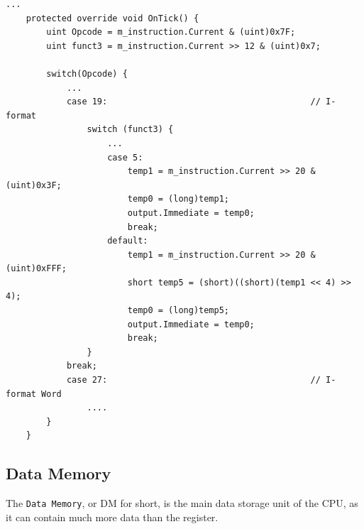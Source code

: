         \begin{minipage}{\linewidth}
            \begin{lstlisting}[language={[Sharp]C}, caption={A slice of the \texttt{IMMGEN} process SME code. We first extract the opcode and funct3 fields from the instruction and put them in a variable. We then use a \texttt{switch} statement and the opcode to determine what type of instruction we are dealing with. Since some instructions of same type like \texttt{slli} only use the lower 6 bits in the immediate field (shamt field), we need another switch statement to tell these apart using the funct3 field. Lastly we construct the immediate and output it . Note that in line 18 we make use of a little hack to retain the sign bit of a 12 bit number since it is not supported in \texttt{C\#}},captionpos=b, label = IMMGEN]
...
    protected override void OnTick() {
        uint Opcode = m_instruction.Current & (uint)0x7F;
        uint funct3 = m_instruction.Current >> 12 & (uint)0x7;
            
        switch(Opcode) {
            ...
            case 19:                                        // I-format
                switch (funct3) {
                    ...
                    case 5:
                        temp1 = m_instruction.Current >> 20 & (uint)0x3F;
                        temp0 = (long)temp1;
                        output.Immediate = temp0;
                        break;
                    default:
                        temp1 = m_instruction.Current >> 20 & (uint)0xFFF;
                        short temp5 = (short)((short)(temp1 << 4) >> 4);
                        temp0 = (long)temp5;
                        output.Immediate = temp0;
                        break;
                }
            break;
            case 27:                                        // I-format Word
                ....
        }
    }
            \end{lstlisting}
        \end{minipage} 
\newpage
    \subsection{Data Memory}
        The \texttt{Data Memory}, or DM for short, is the main data storage unit of the CPU, as it can contain much more data than the register.
        

